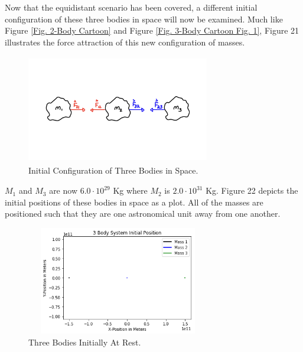 \documentclass[twocolumn]{article}
\begin{document}
Now that the equidistant scenario has been covered, a different initial configuration of these three bodies in space will now be examined. Much like Figure \ref{Fig. 2-Body Cartoon} and Figure \ref{Fig. 3-Body Cartoon Fig. 1}, Figure 21 illustrates the force attraction of this new configuration of masses.
\begin{figure}[h]
    \centering
    \includegraphics[width=8cm, height=4.75cm]{Figures/3-Body Cartoon (2).png}
    \caption{\small{Initial Configuration of Three Bodies in Space.}}
    \label{Fig. 3-Body Cartoon Fig. 2}
\end{figure}
\begin{center}
\end{center}
\newpage \noindent
$M_1$ and $M_3$ are now $6.0\cdot10^{29}$ Kg where $M_2$ is $2.0\cdot10^{31}$ Kg. Figure 22 depicts the initial positions of these bodies in space as a plot. All of the masses are positioned such that they are one astronomical unit away from one another. 
\begin{figure}[h]
    \centering
    \includegraphics[width=8cm, height=4.75cm]{Figures/3-Body Dynamics (9).png}
    \caption{\small{Three Bodies Initially At Rest.}}
    \label{Fig. 3-Body Dynamics Fig. 9}
\end{figure}
\end{document}
